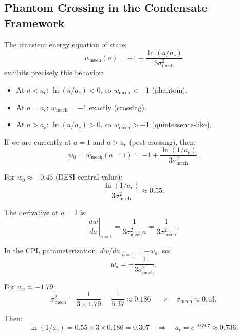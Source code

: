 \documentclass[11pt,a4paper]{article}
\newcommand{\wmech}{\ensuremath{w_{\mathrm{mech}}}}
\theoremstyle{definition}
\theoremstyle{remark}
\begin{document}
\subsection{Phantom Crossing in the Condensate Framework}
\label{sec:phantom_crossing}

The transient energy equation of state:
\begin{equation}
\wmech(a) = -1 + \frac{\ln(a/a_c)}{3\sigma_{\mathrm{mech}}^2}
\end{equation}
exhibits precisely this behavior:
\begin{itemize}[leftmargin=*, itemsep=0.2em]
\item At $a < a_c$: $\ln(a/a_c) < 0$, so $\wmech < -1$ (phantom).
\item At $a = a_c$: $\wmech = -1$ exactly (crossing).
\item At $a > a_c$: $\ln(a/a_c) > 0$, so $\wmech > -1$ (quintessence-like).
\end{itemize}

If we are currently at $a = 1$ and $a > a_c$ (post-crossing), then:
\begin{equation}
w_0 = \wmech(a=1) = -1 + \frac{\ln(1/a_c)}{3\sigma_{\mathrm{mech}}^2}.
\end{equation}

For $w_0 \approx -0.45$ (DESI central value):
\begin{equation}
\frac{\ln(1/a_c)}{3\sigma_{\mathrm{mech}}^2} \approx 0.55.
\end{equation}

The derivative at $a = 1$ is:
\begin{equation}
\left.\frac{dw}{da}\right|_{a=1} = \frac{1}{3\sigma_{\mathrm{mech}}^2 a} = \frac{1}{3\sigma_{\mathrm{mech}}^2}.
\end{equation}

In the CPL parameterization, $dw/da|_{a=1} = -w_a$, so:
\begin{equation}
w_a = -\frac{1}{3\sigma_{\mathrm{mech}}^2}.
\end{equation}

For $w_a \approx -1.79$:
\begin{equation}
\sigma_{\mathrm{mech}}^2 = \frac{1}{3 \times 1.79} = \frac{1}{5.37} \approx 0.186 \quad \Rightarrow \quad \sigma_{\mathrm{mech}} \approx 0.43.
\end{equation}

Then:
\begin{equation}
\ln(1/a_c) = 0.55 \times 3 \times 0.186 = 0.307 \quad \Rightarrow \quad a_c = e^{-0.307} \approx 0.736.
\end{equation}
\end{document}
